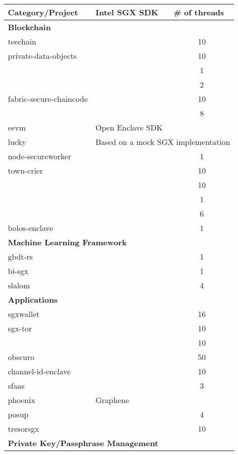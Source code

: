 \begin{table}[h]
	\centering
	\begin{tabular}{lcc}
		\toprule
		\textbf{Category/Project} & \multicolumn{1}{l}{\textbf{Intel SGX SDK}} 
		& 
		\multicolumn{1}{l}{\textbf{\# of threads}} \\ \midrule \midrule
		\multicolumn{3}{l}{\textbf{Blockchain}} \\ \midrule
		teechain & \checkmark & 10 \\
		private-data-objects & \checkmark & 10 \\
		& \checkmark & 1 \\
		& \checkmark & 2 \\
		fabric-secure-chaincode & \checkmark & 10 \\
		& \checkmark & 8 \\
		eevm & \multicolumn{2}{l}{Open Enclave SDK~\cite{openenclave}} \\
		lucky & \multicolumn{2}{l}{Based on a mock SGX implementation} \\
		node-secureworker & \checkmark & 1 \\
		town-crier & \checkmark & 10 \\
		& \checkmark & 10 \\
		& \checkmark & 1 \\
		& \checkmark & 6 \\
		bolos-enclave & \checkmark & 1 \\ \midrule
		\multicolumn{3}{l}{\textbf{Machine Learning Framework}} \\ \midrule
		gbdt-rs & \checkmark & 1 \\
		bi-sgx & \checkmark & 1 \\
		slalom & \checkmark & 4 \\ \midrule
		\multicolumn{3}{l}{\textbf{Applications}} \\ \midrule
		sgxwallet & \checkmark & 16 \\
		sgx-tor & \checkmark & 10 \\
		& \checkmark & 10 \\
		obscuro & \checkmark & 50 \\
		channel-id-enclave & \checkmark & 10 \\
		sfaas & \checkmark & 3 \\
		phoenix & \multicolumn{2}{l}{Graphene~\cite{203255}} \\
		posup & \checkmark & 4 \\
		tresorsgx & \checkmark & 10 \\ \midrule
		\multicolumn{3}{l}{\textbf{Private Key/Passphrase Management}} \\ 

\end{tabular}
\end{table}

